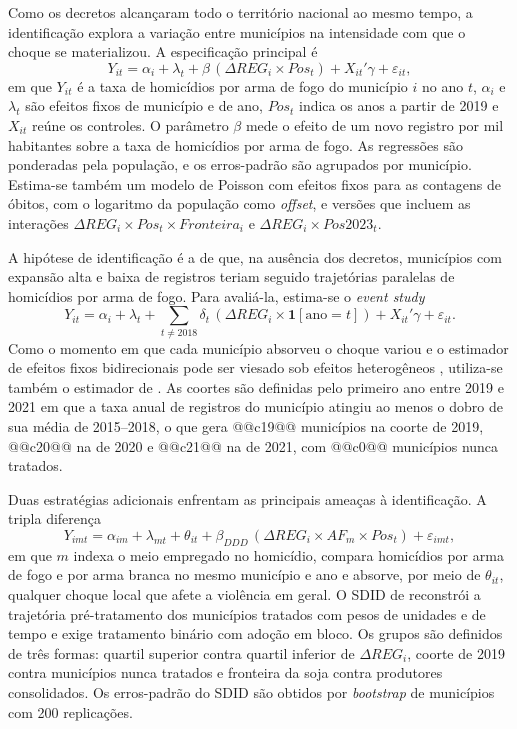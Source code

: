\documentclass[11pt,a4paper]{article}
\begin{document}
Como os decretos alcançaram todo o território nacional ao mesmo tempo, a identificação explora a variação entre municípios na intensidade com que o choque se materializou. A especificação principal é
\begin{equation}\label{eq:twfe}
Y_{it} = \alpha_i + \lambda_t + \beta\,(\Delta REG_i \times Pos_t) + X_{it}'\gamma + \varepsilon_{it},
\end{equation}
em que $Y_{it}$ é a taxa de homicídios por arma de fogo do município $i$ no ano $t$, $\alpha_i$ e $\lambda_t$ são efeitos fixos de município e de ano, $Pos_t$ indica os anos a partir de 2019 e $X_{it}$ reúne os controles. O parâmetro $\beta$ mede o efeito de um novo registro por mil habitantes sobre a taxa de homicídios por arma de fogo. As regressões são ponderadas pela população, e os erros-padrão são agrupados por município. Estima-se também um modelo de Poisson com efeitos fixos para as contagens de óbitos, com o logaritmo da população como \textit{offset}, e versões que incluem as interações $\Delta REG_i \times Pos_t \times Fronteira_i$ e $\Delta REG_i \times Pos2023_t$.

A hipótese de identificação é a de que, na ausência dos decretos, municípios com expansão alta e baixa de registros teriam seguido trajetórias paralelas de homicídios por arma de fogo. Para avaliá-la, estima-se o \textit{event study}
\begin{equation}
Y_{it} = \alpha_i + \lambda_t + \sum_{t\neq 2018}\delta_t\,(\Delta REG_i\times \mathbf{1}[\text{ano}=t]) + X_{it}'\gamma + \varepsilon_{it}.
\end{equation}
Como o momento em que cada município absorveu o choque variou e o estimador de efeitos fixos bidirecionais pode ser viesado sob efeitos heterogêneos \citep{goodmanbacon2021,dechaisemartin2020,sun2021}, utiliza-se também o estimador de \citet{callaway2021}. As coortes são definidas pelo primeiro ano entre 2019 e 2021 em que a taxa anual de registros do município atingiu ao menos o dobro de sua média de 2015--2018, o que gera @@c19@@ municípios na coorte de 2019, @@c20@@ na de 2020 e @@c21@@ na de 2021, com @@c0@@ municípios nunca tratados.

Duas estratégias adicionais enfrentam as principais ameaças à identificação. A tripla diferença
\begin{equation}
Y_{imt} = \alpha_{im} + \lambda_{mt} + \theta_{it} + \beta_{DDD}\,(\Delta REG_i\times AF_m\times Pos_t) + \varepsilon_{imt},
\end{equation}
em que $m$ indexa o meio empregado no homicídio, compara homicídios por arma de fogo e por arma branca no mesmo município e ano e absorve, por meio de $\theta_{it}$, qualquer choque local que afete a violência em geral. O SDID de \citet{arkhangelsky2021} reconstrói a trajetória pré-tratamento dos municípios tratados com pesos de unidades e de tempo e exige tratamento binário com adoção em bloco. Os grupos são definidos de três formas: quartil superior contra quartil inferior de $\Delta REG_i$, coorte de 2019 contra municípios nunca tratados e fronteira da soja contra produtores consolidados. Os erros-padrão do SDID são obtidos por \textit{bootstrap} de municípios com 200 replicações.
\end{document}

